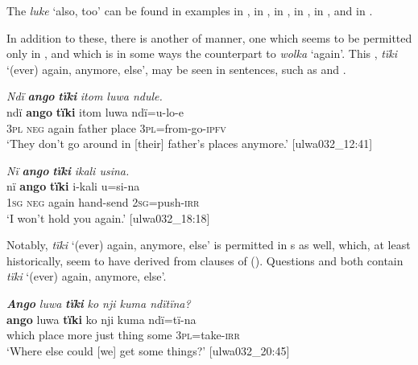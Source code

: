 The  \textit{luke} ‘also, too’ can be found in examples  in ,  in ,  in ,  in ,  in , and  in .

  In addition to these, there is another  of manner, one which seems to be permitted only in  , and which is in some ways the  counterpart to \textit{wolka} ‘again’. This , \textit{tïki} ‘(ever) again, anymore, else’, may be seen in  sentences, such as  and .



\ea%
    \label{ex:otherwc:113}
          \textit{Ndï} \textbf{\textit{ango}} \textbf{\textit{tïki}} \textit{itom luwa ndule.}\\
\gll    ndï  \textbf{ango}  \textbf{tïki}    itom  luwa  ndï=u-lo-e\\
    3\textsc{pl}  \textsc{neg}  again  father  place  3\textsc{pl}=from-go-\textsc{ipfv}\\
\glt `They don’t go around in [their] father’s places anymore.’ [ulwa032\_12:41]
\z

\ea%
    \label{ex:otherwc:114}
          \textit{Nï} \textbf{\textit{ango}} \textbf{\textit{tïki}} \textit{ikali usina.}\\
\gll    nï    \textbf{ango}  \textbf{tïki}    i-kali    u=si-na\\
    1\textsc{sg}  \textsc{neg}  again  hand-send  2\textsc{sg=}push-\textsc{irr}\\
\glt `I won’t hold you again.’ [ulwa032\_18:18]
\z

Notably, \textit{tïki} ‘(ever) again, anymore, else’ is permitted in s as well, which, at least historically, seem to have derived from clauses of   (). Questions  and  both contain  \textit{tïki} ‘(ever) again, anymore, else’.

\ea%
    \label{ex:otherwc:115}
          \textbf{\textit{Ango}} \textit{luwa} \textbf{\textit{tïki}} \textit{ko nji kuma ndïtïna?}\\
\gll    \textbf{ango}  luwa  \textbf{tïki}    ko  nji    kuma  ndï=tï-na\\
    which  place  more  just  thing  some  3\textsc{pl}=take-\textsc{irr}\\
\glt `Where else could [we] get some things?’ [ulwa032\_20:45]
\z

